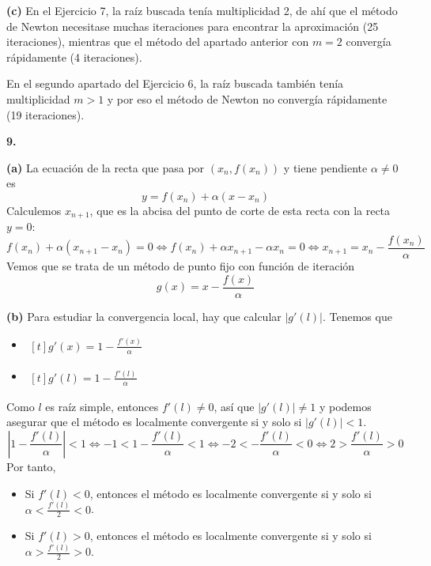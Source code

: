 \documentclass[12pt]{report}
\begin{document}
\vspace{2mm}
\textbf{(c) } En el Ejercicio 7, la raíz buscada tenía multiplicidad 2, de ahí que el método de Newton necesitase muchas iteraciones para encontrar la aproximación (25 iteraciones), mientras que el método del apartado anterior con $m = 2$ convergía rápidamente (4 iteraciones).

\vspace{2mm} En el segundo apartado del Ejercicio 6, la raíz buscada también tenía multiplicidad $m > 1$ y por eso el método de Newton no convergía rápidamente (19 iteraciones).

\vspace{6mm}
\textbf{9. }

\vspace{2mm}
\textbf{(a) } La ecuación de la recta que pasa por $(x_n,f(x_n))$ y tiene pendiente $\alpha \neq 0$ es
\[y = f(x_n) + \alpha(x-x_n)\]
Calculemos $x_{n+1}$, que es la abcisa del punto de corte de esta recta con la recta $y=0$:
\[f(x_n) + \alpha(x_{n+1}-x_n) = 0 \iff f(x_n) + \alpha x_{n+1} - \alpha x_n = 0 \iff x_{n+1} = x_n - \frac{f(x_n)}{\alpha}\]
Vemos que se trata de un método de punto fijo con función de iteración
\[g(x) = x - \frac{f(x)}{\alpha}\]

\vspace{2mm}
\textbf{(b) } Para estudiar la convergencia local, hay que calcular $|g'(l)|$. Tenemos que
\begin{itemize}
    \item
    $
    \begin{aligned}[t]
        g'(x) = 1 - \frac{f'(x)}{\alpha}
    \end{aligned}
    $
    \item
    $
    \begin{aligned}[t]
        g'(l) = 1 - \frac{f'(l)}{\alpha}
    \end{aligned}
    $ 
\end{itemize}
Como $l$ es raíz simple, entonces $f'(l) \neq 0$, así que $|g'(l)| \neq 1$ y podemos asegurar que el método es localmente convergente si y solo si $|g'(l)|<1$.
\[|1-\frac{f'(l)}{\alpha}|<1 \iff -1<1-\frac{f'(l)}{\alpha}<1 \iff -2<-\frac{f'(l)}{\alpha}<0 \iff 2>\frac{f'(l)}{\alpha}>0\]
Por tanto,
\begin{itemize}
    \item Si $f'(l) < 0$, entonces el método es localmente convergente si y solo si $\alpha < \frac{f'(l)}{2}<0$.
    \item Si $f'(l) > 0$, entonces el método es localmente convergente si y solo si $\alpha > \frac{f'(l)}{2}>0$.
\end{itemize}
\end{document}
